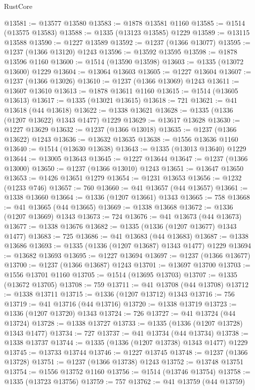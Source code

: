 \begin{lexlean}{RustCore}
\begin{coremodule}
@13581 := @13577 @13580
@13583 := @1878 @13581 @1160
@13585 := @1514 (@13575 @13583)
@13588 := @1335 (@13123 @13585) @1229
@13589 := @13115 @13588
@13590 := @1227 @13589
@13592 := @1237 (@1366 @13077)
@13595 := @1237 (@1366 @13120) @1243
@13596 := @13592 @13595
@13598 := @1878 @13596 @1160
@13600 := @1514 (@13590 @13598)
@13603 := @1335 (@13072 @13600) @1229
@13604 := @13064 @13603
@13605 := @1227 @13604
@13607 := @1237 (@1366 @13026)
@13610 := @1237 (@1366 @13069) @1243
@13611 := @13607 @13610
@13613 := @1878 @13611 @1160
@13615 := @1514 (@13605 @13613)
@13617 := @1335 (@13021 @13615)
@13618 := 721
@13621 := @41 @13618 (@44 @13618)
@13622 := @1338 @13621
@13628 := @1335 (@1336 (@1207 @13622) @1343 @1477) @1229
@13629 := @13617 @13628
@13630 := @1227 @13629
@13632 := @1237 (@1366 @13018)
@13635 := @1237 (@1366 @13622) @1243
@13636 := @13632 @13635
@13638 := @1556 @13636 @1160
@13640 := @1514 (@13630 @13638)
@13643 := @1335 (@13013 @13640) @1229
@13644 := @13005 @13643
@13645 := @1227 @13644
@13647 := @1237 (@1366 @13000)
@13650 := @1237 (@1366 @13010) @1243
@13651 := @13647 @13650
@13653 := @1426 @13651 @1279
@13654 := @1231 @13653
@13656 := @1232 (@1233 @746)
@13657 := 760
@13660 := @41 @13657 (@44 @13657)
@13661 := @1338 @13660
@13664 := @1336 (@1207 @13661) @1343
@13665 := 758
@13668 := @41 @13665 (@44 @13665)
@13669 := @1338 @13668
@13672 := @1336 (@1207 @13669) @1343
@13673 := 724
@13676 := @41 @13673 (@44 @13673)
@13677 := @1338 @13676
@13682 := @1335 (@1336 (@1207 @13677) @1343 @1477)
@13683 := 725
@13686 := @41 @13683 (@44 @13683)
@13687 := @1338 @13686
@13693 := @1335 (@1336 (@1207 @13687) @1343 @1477) @1229
@13694 := @13682 @13693
@13695 := @1227 @13694
@13697 := @1237 (@1366 @13677)
@13700 := @1237 (@1366 @13687) @1243
@13701 := @13697 @13700
@13703 := @1556 @13701 @1160
@13705 := @1514 (@13695 @13703)
@13707 := @1335 (@13672 @13705)
@13708 := 759
@13711 := @41 @13708 (@44 @13708)
@13712 := @1338 @13711
@13715 := @1336 (@1207 @13712) @1343
@13716 := 756
@13719 := @41 @13716 (@44 @13716)
@13720 := @1338 @13719
@13723 := @1336 (@1207 @13720) @1343
@13724 := 726
@13727 := @41 @13724 (@44 @13724)
@13728 := @1338 @13727
@13733 := @1335 (@1336 (@1207 @13728) @1343 @1477)
@13734 := 727
@13737 := @41 @13734 (@44 @13734)
@13738 := @1338 @13737
@13744 := @1335 (@1336 (@1207 @13738) @1343 @1477) @1229
@13745 := @13733 @13744
@13746 := @1227 @13745
@13748 := @1237 (@1366 @13728)
@13751 := @1237 (@1366 @13738) @1243
@13752 := @13748 @13751
@13754 := @1556 @13752 @1160
@13756 := @1514 (@13746 @13754)
@13758 := @1335 (@13723 @13756)
@13759 := 757
@13762 := @41 @13759 (@44 @13759)

\end{coremodule}
\end{lexlean}

